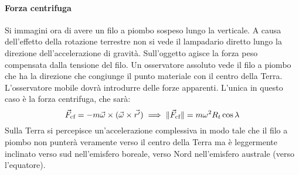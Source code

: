 \documentclass[10pt,a4paper]{book}
\DeclarePairedDelimiter{\norma}{\lVert}{\rVert} %
\begin{document}
\paragraph{Forza centrifuga} Si immagini ora di avere un filo a piombo sospeso lungo la verticale. A causa dell'effetto della rotazione terrestre non si vede il lampadario diretto lungo la direzione dell'accelerazione di gravità. Sull'oggetto agisce la forza peso compensata dalla tensione del filo. Un osservatore assoluto vede il filo a piombo che ha la direzione che congiunge il punto materiale con il centro della Terra. L'osservatore mobile dovrà introdurre delle forze apparenti. L'unica in questo caso è la forza centrifuga, che sarà:
\[
	\vec{F}_{\text{cf}}=-m \vec{\omega} \times (\vec{\omega} \times \vec{r'} ) \implies \norma{\vec{F}_{\text{cf}}}=m\omega^2 R_t \cos\lambda
\]
Sulla Terra si percepisce un'accelerazione complessiva in modo tale che il filo a piombo non punterà veramente verso il centro della Terra ma è leggermente inclinato verso sud nell'emisfero boreale, verso Nord nell'emisfero australe (verso l'equatore).
\end{document}
